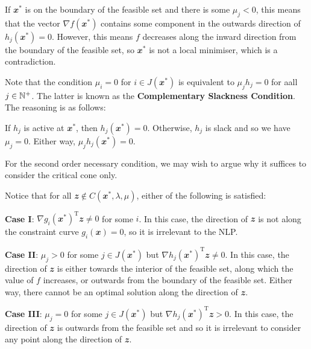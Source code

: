 \documentclass[math, code]{amznotes}
\theoremstyle{remark}
\begin{document}
If $\mathbfit{x}^*$ is on the boundary of the feasible set and there is some $\mu_j < 0$, this means that the vector $\nabla f(\mathbfit{x}^*)$ contains some component in the outwards direction of $h_j(\mathbfit{x}^*) = 0$. However, this means $f$ decreases along the inward direction from the boundary of the feasible set, so $\mathbfit{x}^*$ is not a local minimiser, which is a contradiction.

Note that the condition $\mu_i = 0$ for $i \in J(\mathbfit{x}^*)$ is equivalent to $\mu_jh_j = 0$ for aall $j \in \mathbb{N}^+$. The latter is known as the \textbf{Complementary Slackness Condition}. The reasoning is as follows:

If $h_j$ is active at $\mathbfit{x}^*$, then $h_j(\mathbfit{x}^*) = 0$. Otherwise, $h_j$ is slack and so we have $\mu_j = 0$. Either way, $\mu_jh_j(\mathbfit{x}^*) = 0$.

For the second order necessary condition, we may wish to argue why it suffices to consider the critical cone only.

Notice that for all $\mathbfit{z} \notin C(\mathbfit{x}^*, \lambda, \mu)$, either of the following is satisfied:

\textbf{Case I}: $\nabla g_i(\mathbfit{x}^*)^{\mathrm{T}}\mathbfit{z} \neq 0$ for some $i$. In this case, the direction of $\mathbfit{z}$ is not along the constraint curve $g_i(\mathbfit{x}) = 0$, so it is irrelevant to the NLP. 

\textbf{Case II}: $\mu_j > 0$ for some $j \in J(\mathbfit{x}^*)$ but $\nabla h_j(\mathbfit{x}^*)^{\mathrm{T}}\mathbfit{z} \neq 0$. In this case, the direction of $\mathbfit{z}$ is either towards the interior of the feasible set, along which the value of $f$ increases, or outwards from the boundary of the feasible set. Either way, there cannot be an optimal solution along the direction of $\mathbfit{z}$.

\textbf{Case III}: $\mu_j = 0$ for some $j \in J(\mathbfit{x}^*)$ but $\nabla h_j(\mathbfit{x}^*)^{\mathrm{T}}\mathbfit{z} > 0$. In this case, the direction of $\mathbfit{z}$ is outwards from the feasible set and so it is irrelevant to consider any point along the direction of $\mathbfit{z}$.
\end{document}
